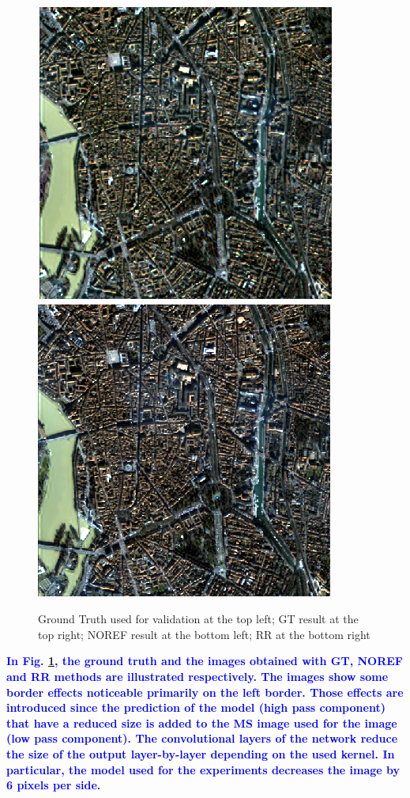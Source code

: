 \documentclass[12pt]{report}
\newcommand{\bb}[1]{\textcolor{blue}{\textbf{#1}}}
\begin{document}
\begin{figure}
    \includegraphics[scale=.6]{NOREF.png}
    \includegraphics[scale=.6]{RR.png}
    \caption{Ground Truth used for validation at the top left; GT result at the top right; NOREF result at the bottom left; RR at the bottom right}
    \label{fig:comparison_results}
\end{figure}


\bb{In Fig. \ref{fig:comparison_results}, the ground truth and the images obtained with GT, NOREF and RR methods are illustrated respectively.
The images show some border effects noticeable primarily on the left border. Those effects are introduced since the prediction of the model (high pass component) that have a reduced size is added to the MS image used for the image (low pass component). 
The convolutional layers of the network reduce the size of the output layer-by-layer depending on the used kernel. In particular, the model used for the experiments decreases the image by 6 pixels per side.}
\end{document}
